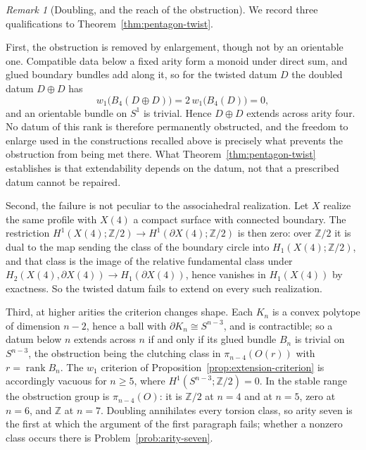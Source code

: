 \documentclass[11pt,letterpaper,twoside]{article}
\theoremstyle{plain}
\theoremstyle{definition}
\theoremstyle{remark}
\newtheorem{remark}[theorem]{Remark}
\begin{document}
\begin{remark}[Doubling, and the reach of the obstruction]\label{rem:doubling}
We record three qualifications to Theorem~\ref{thm:pentagon-twist}.

First, the obstruction is removed by enlargement, though not by an orientable one.  Compatible data below a fixed arity form a monoid under direct sum, and glued boundary bundles add along it, so for the twisted datum \(D\) the doubled datum \(D\oplus D\) has
\[
 w_1\bigl(B_4(D\oplus D)\bigr)=2\,w_1\bigl(B_4(D)\bigr)=0 ,
\]
and an orientable bundle on \(S^1\) is trivial.  Hence \(D\oplus D\) extends across arity four.  No datum of this rank is therefore permanently obstructed, and the freedom to enlarge used in the constructions recalled above is precisely what prevents the obstruction from being met there.  What Theorem~\ref{thm:pentagon-twist} establishes is that extendability depends on the datum, not that a prescribed datum cannot be repaired.

Second, the failure is not peculiar to the associahedral realization.  Let \(X\) realize the same profile with \(X(4)\) a compact surface with connected boundary.  The restriction \(H^1(X(4);\mathbb Z/2)\to H^1(\partial X(4);\mathbb Z/2)\) is then zero: over \(\mathbb Z/2\) it is dual to the map sending the class of the boundary circle into \(H_1(X(4);\mathbb Z/2)\), and that class is the image of the relative fundamental class under \(H_2(X(4),\partial X(4))\to H_1(\partial X(4))\), hence vanishes in \(H_1(X(4))\) by exactness.  So the twisted datum fails to extend on every such realization.

Third, at higher arities the criterion changes shape.  Each \(K_n\) is a convex polytope of dimension \(n-2\), hence a ball with \(\partial K_n\cong S^{n-3}\), and is contractible; so a datum below \(n\) extends across \(n\) if and only if its glued bundle \(B_n\) is trivial on \(S^{n-3}\), the obstruction being the clutching class in \(\pi_{n-4}(O(r))\) with \(r=\operatorname{rank}B_n\).  The \(w_1\) criterion of Proposition~\ref{prop:extension-criterion} is accordingly vacuous for \(n\geq5\), where \(H^1(S^{n-3};\mathbb Z/2)=0\).  In the stable range the obstruction group is \(\pi_{n-4}(O)\): it is \(\mathbb Z/2\) at \(n=4\) and at \(n=5\), zero at \(n=6\), and \(\mathbb Z\) at \(n=7\).  Doubling annihilates every torsion class, so arity seven is the first at which the argument of the first paragraph fails; whether a nonzero class occurs there is Problem~\ref{prob:arity-seven}.
\end{remark}
\end{document}
